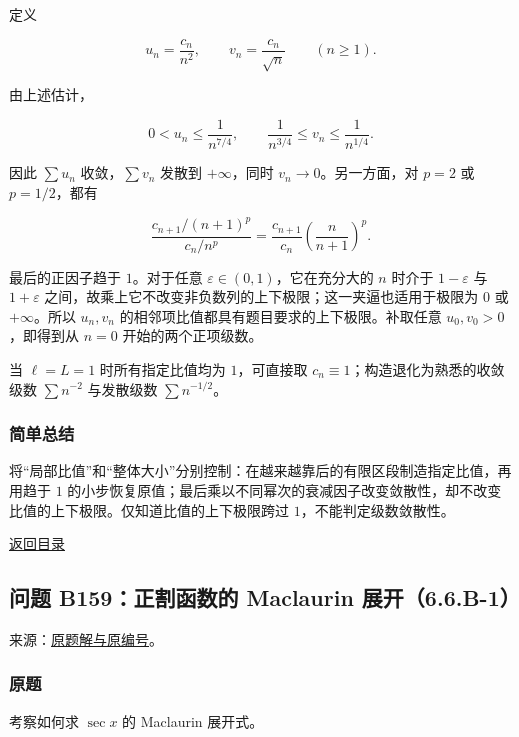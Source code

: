 \documentclass[11pt,a4paper]{article}
\begin{document}
定义

\[
u_n=\frac{c_n}{n^2},
\qquad v_n=\frac{c_n}{\sqrt n}\qquad(n\ge1).
\]

由上述估计，

\[
0<u_n\le\frac1{n^{7/4}},
\qquad
\frac1{n^{3/4}}\le v_n\le\frac1{n^{1/4}}.
\]

因此 \(\sum u_n\) 收敛，\(\sum v_n\) 发散到 \(+\infty\)，同时
\(v_n\to0\)。另一方面，对 \(p=2\) 或 \(p=1/2\)，都有

\[
\frac{c_{n+1}/(n+1)^p}{c_n/n^p}
=\frac{c_{n+1}}{c_n}\left(\frac n{n+1}\right)^p.
\]

最后的正因子趋于 \(1\)。对于任意 \(\varepsilon\in(0,1)\)，它在充分大的
\(n\) 时介于 \(1-\varepsilon\) 与 \(1+\varepsilon\)
之间，故乘上它不改变非负数列的上下极限；这一夹逼也适用于极限为 \(0\) 或
\(+\infty\)。所以 \(u_n,v_n\)
的相邻项比值都具有题目要求的上下极限。补取任意 \(u_0,v_0>0\)，即得到从
\(n=0\) 开始的两个正项级数。

当 \(\ell=L=1\) 时所有指定比值均为 \(1\)，可直接取
\(c_n\equiv1\)；构造退化为熟悉的收敛级数 \(\sum n^{-2}\) 与发散级数
\(\sum n^{-1/2}\)。

\subsubsection{简单总结}\label{ux7b80ux5355ux603bux7ed3-24}

将``局部比值''和``整体大小''分别控制：在越来越靠后的有限区段制造指定比值，再用趋于
\(1\)
的小步恢复原值；最后乘以不同幂次的衰减因子改变敛散性，却不改变比值的上下极限。仅知道比值的上下极限跨过
\(1\)，不能判定级数敛散性。

\noindent\hyperref[contents]{返回目录}

\subsection{问题 B159：正割函数的 Maclaurin
展开（6.6.B-1）}\label{ux95eeux9898-b159ux6b63ux5272ux51fdux6570ux7684-maclaurin-ux5c55ux5f006.6.b-1}

来源：\href{https://zj139.github.io/math-notes/problems/07a9f1208dd119dd666e6278/\#问题-b159}{原题解与原编号}。

\subsubsection{原题}\label{ux539fux9898-25}

考察如何求 \(\sec x\) 的 Maclaurin 展开式。
\end{document}

